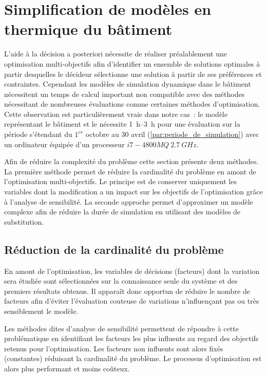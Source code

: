 \section{Simplification de modèles en thermique du bâtiment} %
\label{sec:simplification_de_modeles_en_thermique_du_batiment}
L’aide à la décision a posteriori nécessite de réaliser préalablement une optimisation
multi-objectifs afin d’identifier un ensemble de solutions optimales à partir desquelles le
décideur sélectionne une solution à partir de ses préférences et contraintes.
Cependant les modèles de simulation dynamique dans le bâtiment nécessitent un temps de calcul
important non compatible avec des méthodes nécessitant de nombreuses évaluations comme
certaines méthodes d’optimisation. Cette observation est particulièrement vraie dans notre
cas~: le modèle représentant le bâtiment et le  nécessite \SIrange{1}{3}{\hour}
pour une évaluation sur la période s’étendant du $1^{er}$ octobre au $30$ avril (\ref{par:periode_de_simulation})
avec un ordinateur équipée d’un processeur $i7-4800MQ\  \SI{2.7}{GHz}$.

Afin de réduire la complexité du problème cette section présente deux méthodes.
La première méthode permet de réduire la cardinalité du problème en amont de
l’optimisation multi-objectifs. Le principe est de conserver uniquement les variables
dont la modification a un impact sur les objectifs de l’optimisation grâce à l’analyse de
sensibilité. La seconde approche permet d’approximer un modèle complexe afin de réduire la
durée de simulation en utilisant des modèles de substitution.


\subsection{Réduction de la cardinalité du problème} %
\label{sub:reduction_de_la_cardinalite_du_probleme}
En amont de l’optimisation, les variables de décisions (facteurs) dont la variation sera
étudiée sont sélectionnées sur la connaissance seule du système et des premiers résultats
obtenus. Il apparaît donc opportun de réduire le nombre de facteurs afin d’éviter
l’évaluation couteuse de variations n’influençant pas ou très sensiblement le modèle.

Les méthodes dites d’analyse de sensibilité permettent de répondre à cette problématique
en identifiant les facteurs les plus influents au regard des objectifs retenus pour
l’optimisation. Les facteurs non influents sont alors fixés (constantes) réduisant la
cardinalité du problème. Le processus d’optimisation est alors plus performant et moins
coûteux.

